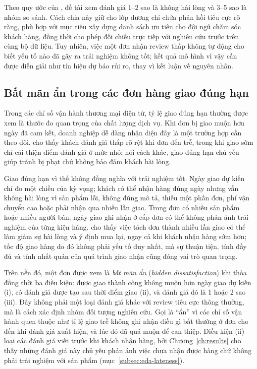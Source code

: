 \documentclass[12pt,a4paper]{report}
\begin{document}
Theo quy ước của \textcite{orman2026}, đề tài xem đánh giá 1--2 sao là không hài lòng và 3--5 sao là nhóm so sánh. Cách chia này giữ cho lớp dương chỉ chứa phản hồi tiêu cực rõ ràng, phù hợp với mục tiêu xây dựng danh sách ưu tiên cho đội ngũ chăm sóc khách hàng, đồng thời cho phép đối chiếu trực tiếp với nghiên cứu trước trên cùng bộ dữ liệu. Tuy nhiên, việc một đơn nhận review thấp không tự động cho biết yếu tố nào đã gây ra trải nghiệm không tốt; kết quả mô hình vì vậy cần được diễn giải như tín hiệu dự báo rủi ro, thay vì kết luận về nguyên nhân.

\subsection{Bất mãn ẩn trong các đơn hàng giao đúng hạn}\label{sec:con-hidden}

Trong các chỉ số vận hành thương mại điện tử, tỷ lệ giao đúng hạn thường được xem là thước đo quan trọng của chất lượng dịch vụ. Khi đơn bị giao muộn hơn ngày đã cam kết, doanh nghiệp dễ dàng nhận diện đây là một trường hợp cần theo dõi. \textcite{ravula2023} cho thấy khách đánh giá thấp rõ rệt khi đơn đến trễ, trong khi giao sớm chỉ cải thiện điểm đánh giá ở mức nhỏ; nói cách khác, giao đúng hạn chủ yếu giúp tránh bị phạt chứ không bảo đảm khách hài lòng.

Giao đúng hạn vì thế không đồng nghĩa với trải nghiệm tốt. Ngày giao dự kiến chỉ đo một chiều của kỳ vọng; khách có thể nhận hàng đúng ngày nhưng vẫn không hài lòng vì sản phẩm lỗi, không đúng mô tả, thiếu một phần đơn, phí vận chuyển cao hoặc phải nhận qua nhiều lần giao. Trong đơn có nhiều sản phẩm hoặc nhiều người bán, ngày giao ghi nhận ở cấp đơn có thể không phản ánh trải nghiệm của từng kiện hàng. \textcite{brylla2022} cho thấy việc tách đơn thành nhiều lần giao có thể làm giảm sự hài lòng và ý định mua lại, ngay cả khi khách nhận hàng sớm hơn; tốc độ giao hàng do đó không phải yếu tố duy nhất, mà sự thuận tiện, tính đầy đủ và tính nhất quán của quá trình giao nhận cũng đóng vai trò quan trọng.

Trên nền đó, một đơn được xem là \emph{bất mãn ẩn} (\emph{hidden dissatisfaction}) khi thỏa đồng thời ba điều kiện: được giao thành công không muộn hơn ngày giao dự kiến (i), có đánh giá được tạo sau thời điểm giao (ii), và đánh giá đó là 1 hoặc 2 sao (iii). Đây không phải một loại đánh giá khác với review tiêu cực thông thường, mà là cách xác định nhóm đối tượng nghiên cứu. Gọi là ``ẩn'' vì các chỉ số vận hành quen thuộc như tỉ lệ giao trễ không ghi nhận điều gì bất thường ở đơn cho đến khi đánh giá xuất hiện, và lúc đó đã quá muộn để can thiệp. Điều kiện (ii) loại các đánh giá viết trước khi khách nhận hàng, bởi Chương~\ref{ch:results} cho thấy những đánh giá này chủ yếu phản ánh việc chưa nhận được hàng chứ không phải trải nghiệm với sản phẩm (mục~\ref{subsec:eda-lateness}).
\end{document}
